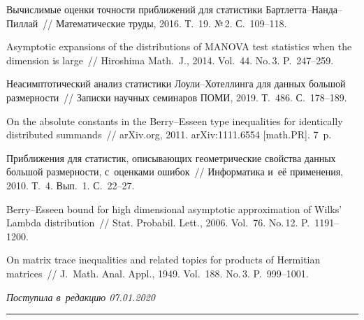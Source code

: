 \begin{multicols}{2}
{{\begin{thebibliography}{99}
 Вы\-чис\-ли\-мые оценки точ\-ности при\-бли\-же\-ний 
для статистики Барт\-лет\-та--Нан\-да--Пил\-лай~//
Математические труды, 2016. Т.~19. №\,2. С.~109--118.

  Asymptotic expansions of the 
distributions of
MANOVA test statistics when the dimension is large~// Hiroshima Math.~J., 2014. 
Vol.~44. No.\,3. P.~247--259.

 Неасимптотический анализ статистики 
Лоу\-ли--Хо\-тел\-лин\-га для данных большой раз\-мер\-ности~//
Записки научных семинаров \mbox{ПОМИ}, 2019. Т.~486. С.~178--189.

  On the absolute constants in the Berry--Esseen type 
inequalities for identically distributed summands~//
arXiv.org, 2011. arXiv:1111.6554 [math.PR]. 7~p.

  Приближения для статистик,
описывающих геометрические свойства данных большой размерности, с~оценками 
ошибок~//
Информатика и~её применения, 2010. Т.~4. Вып.~1. С.~22--27.

  Berry--Esseen bound for high 
dimensional asymptotic approximation of Wilks' Lambda distribution~//
Stat. Probabil. Lett., 2006. Vol.~76. No.\,12. P.~1191--1200.

  On matrix trace inequalities and related topics for 
products of Hermitian matrices~//
J.~Math. Anal. Appl., 1949. Vol.~188. No.\,3. P.~999--1001.
\end{thebibliography}

}
}

\end{multicols}

\vspace*{-3pt}

\hfill{\small\textit{Поступила в~редакцию 07.01.2020}}

\vspace*{8pt}




\hrule

\vspace*{2pt}

